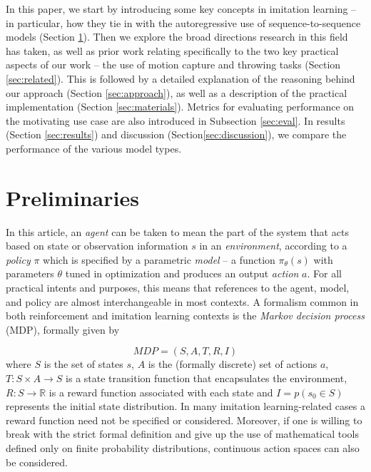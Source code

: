 \documentclass{article}
\begin{document}
In this paper, we start by introducing some key concepts in imitation learning -- in particular, how they tie in with the autoregressive use of sequence-to-sequence models (Section \ref{sec:prelim}). Then we explore the broad directions research in this field has taken, as well as prior work relating specifically to the two key practical aspects of our work -- the use of motion capture and throwing tasks (Section \ref{sec:related}). This is followed by a detailed explanation of the reasoning behind our approach (Section \ref{sec:approach}), as well as a description of the practical implementation (Section \ref{sec:materials}). Metrics for evaluating performance on the motivating use case are also introduced in Subsection \ref{sec:eval}. In results (Section \ref{sec:results}) and discussion (Section\ref{sec:discussion}), we compare the performance of the various model types. 


\section{Preliminaries}
\label{sec:prelim}

In this article, an \emph{agent} can be taken to mean the part of the system that acts based on state or observation information $s$ in an \emph{environment}, according to a \emph{policy} $\pi$ which is specified by a parametric \emph{model} -- a function $\pi_{\theta}(s)$ with parameters $\theta$ tuned in optimization and produces an output \emph{action} $a$. For all practical intents and purposes, this means that references to the agent, model, and policy are almost interchangeable in most contexts. A formalism common in both reinforcement and imitation learning contexts is the \emph{Markov decision process} (MDP), formally given by \citep{attia2018global}

\begin{equation}
	MDP = (S,A,T,R,I)
\end{equation}
where $S$ is the set of states $s$, $A$ is the (formally discrete) set of actions $a$, $T:S \times A \rightarrow S$ is a state transition function that encapsulates the environment, $R:S \rightarrow \mathbb{R}$ is a reward function associated with each state and $I = p\left(s_0 \in S\right)$ represents the initial state distribution. In many imitation learning-related cases a reward function need not be specified or considered. Moreover, if one is willing to break with the strict formal definition and give up the use of mathematical tools defined only on finite probability distributions, continuous action spaces can also be considered.
\end{document}
